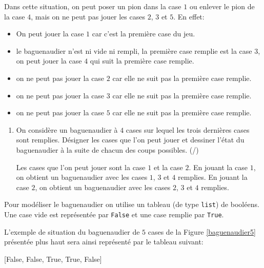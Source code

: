     \medskip


\noindent Dans cette situation, on peut poser un pion dans la case $1$ ou enlever le pion de la case $4$, mais on ne peut pas jouer les cases $2$, $3$ et $5$. En effet:
\begin{itemize}
    \item On peut jouer la case $1$ car c'est la première case du jeu.
    \item le baguenaudier n'est ni vide ni rempli, la première case remplie est la case $3$, on peut jouer la case $4$ qui suit la première case remplie.
    \item on ne peut pas jouer la case $2$ car elle ne suit pas la première case remplie.
    \item on ne peut pas jouer la case $3$ car elle ne suit pas la première case remplie.
    \item on ne peut pas jouer la case $5$ car elle ne suit pas la première case remplie.   
\end{itemize}

\bigskip

\begin{enumerate}[resume=monDS]
\item On considère un baguenaudier à $4$ cases sur lequel les trois dernières cases sont remplies. Désigner les cases que l'on peut jouer et dessiner l'état du baguenaudier à la suite de chacun des coups possibles. (/)

    \begin{blocvisible}[height=2]
        Les cases que l'on peut jouer sont la case $1$ et la case $2$. 
        En jouant la case $1$, on obtient un baguenaudier avec les cases $1$, $3$ et $4$ remplies. En jouant la case $2$, on obtient un baguenaudier avec les cases $2$, $3$ et $4$ remplies.
    \end{blocvisible}


\end{enumerate}

\medskip

 Pour modéliser le baguenaudier on utilise un tableau (de type \verb|list|) de booléens. Une case vide est représentée par \texttt{False} et une case remplie par \texttt{True}.



 L'exemple de situation du baguenaudier de $5$ cases de la Figure \ref{baguenaudier5} présentée plus haut sera ainsi représenté par le tableau suivant: 

    \begin{CodePythontexAlt}[TaillePolice=\large, Largeur=1\linewidth,Centre,Lignes=true,PremLigne=1]{}
[False, False, True, True, False]
\end{CodePythontexAlt}

